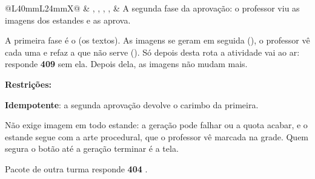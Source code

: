 \begin{tabularx}{\linewidth}{@{}L{40mm}L{24mm}X@{}}
\zebra {} & , , , ,  & A segunda fase da aprovação: o professor viu as imagens dos estandes e as aprova.\par A primeira fase é o  (os textos). As imagens se geram em seguida (), o professor vê cada uma e refaz a que não serve (). Só depois desta rota a atividade vai ao ar:  responde \textbf{409}  sem ela. Depois dela, as imagens não mudam mais.\par \textbf{Restrições:}\par \hspace*{1em}\textbullet{} \textbf{Idempotente}: a segunda aprovação devolve o carimbo da primeira.\par \hspace*{1em}\textbullet{} Não exige imagem em todo estande: a geração pode falhar ou a quota acabar, e o estande segue com a arte procedural, que o professor vê marcada na grade. Quem segura o botão até a geração terminar é a tela.\par \hspace*{1em}\textbullet{} Pacote de outra turma responde \textbf{404} .\\

\end{tabularx}
